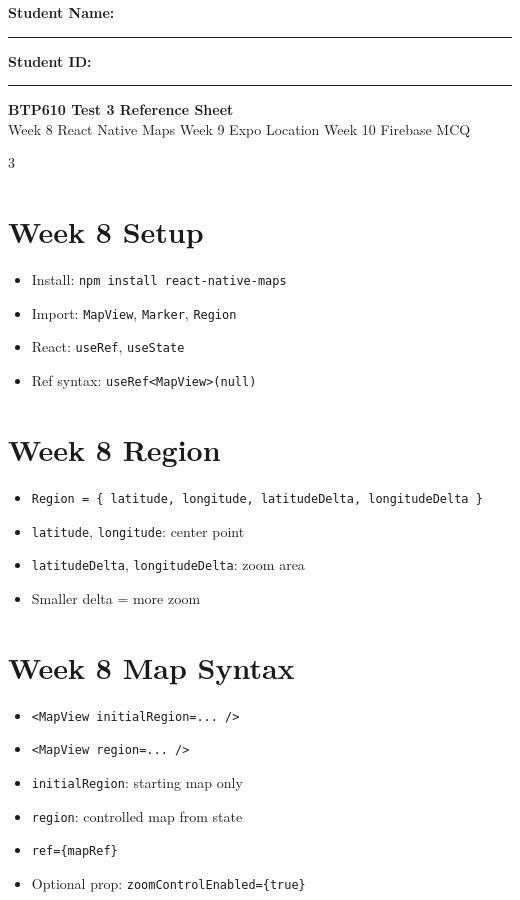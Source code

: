 \documentclass[10pt,letterpaper]{article}
\begin{document}
\textbf{Student Name:} \rule[0pt]{2.5in}{0.4pt} \hfill \textbf{Student ID:} \rule[0pt]{1.7in}{0.4pt}

\begin{center}
\textbf{BTP610 Test 3 Reference Sheet}\\
Week 8 React Native Maps \textbar{} Week 9 Expo Location \textbar{} Week 10 Firebase MCQ
\end{center}

\begin{multicols}{3}

\section*{Week 8 Setup}
\begin{itemize}
  \item Install: \texttt{npm install react-native-maps}
  \item Import: \texttt{MapView}, \texttt{Marker}, \texttt{Region}
  \item React: \texttt{useRef}, \texttt{useState}
  \item Ref syntax: \texttt{useRef<MapView>(null)}
\end{itemize}

\section*{Week 8 Region}
\begin{itemize}
  \item \texttt{Region = \{ latitude, longitude, latitudeDelta, longitudeDelta \}}
  \item \texttt{latitude}, \texttt{longitude}: center point
  \item \texttt{latitudeDelta}, \texttt{longitudeDelta}: zoom area
  \item Smaller delta = more zoom
\end{itemize}

\section*{Week 8 Map Syntax}
\begin{itemize}
  \item \texttt{<MapView initialRegion=... />}
  \item \texttt{<MapView region=... />}
  \item \texttt{initialRegion}: starting map only
  \item \texttt{region}: controlled map from state
  \item \texttt{ref=\{mapRef\}}
  \item Optional prop: \texttt{zoomControlEnabled=\{true\}}
\end{itemize}


\end{multicols}
\end{document}
